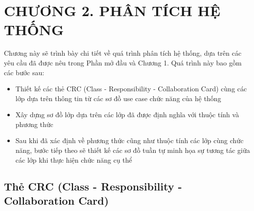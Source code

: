 
\section*{CHƯƠNG 2. PHÂN TÍCH HỆ THỐNG}
\setcounter{section}{2}
\setcounter{subsection}{0} %
\setcounter{table}{0} %
\setcounter{figure}{0} %
Chương này sẽ trình bày chi tiết về quá trình phân tích hệ thống, dựa trên các yêu cầu đã được nêu trong Phần mở đầu và Chương 1. Quá trình này bao gồm các bước sau:\begin{adjustwidth}{1.5em}{}
  \begin{itemize}
    \item Thiết kế các thẻ CRC (Class - Responsibility - Collaboration Card) cùng các lớp dựa trên thông tin từ các sơ đồ use case chức năng của hệ thống
    \item Xây dựng sơ đồ lớp dựa trên các lớp đã được định nghĩa với thuộc tính và phương thức
    \item Sau khi đã xác định về phương thức cũng như thuộc tính các lớp cùng chức năng, bước tiếp theo sẽ thiết kế các sơ đồ tuần tự minh họa sự tương tác giữa các lớp 
          khi thực hiện chức năng cụ thể
  \end{itemize}
  \end{adjustwidth}
\subsection{Thẻ CRC (Class - Responsibility - Collaboration Card)}

